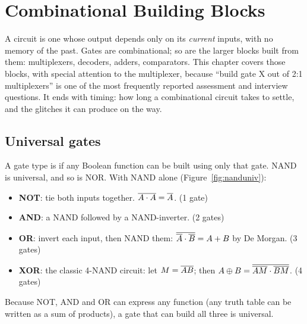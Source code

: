 \chapter{Combinational Building Blocks}
\label{ch:comb}

A  circuit is one whose output depends only on its \emph{current} inputs, with no memory of the past. Gates are combinational; so are the larger blocks built from them: multiplexers, decoders, adders, comparators. This chapter covers those blocks, with special attention to the multiplexer, because ``build gate X out of 2:1 multiplexers'' is one of the most frequently reported assessment and interview questions. It ends with timing: how long a combinational circuit takes to settle, and the glitches it can produce on the way.

\section{Universal gates}

A gate type is  if any Boolean function can be built using only that gate. NAND is universal, and so is NOR. With NAND alone (Figure~\ref{fig:nanduniv}):

\begin{itemize}
  \item \textbf{NOT}: tie both inputs together. $\overline{A \cdot A} = \overline{A}$. (1 gate)
  \item \textbf{AND}: a NAND followed by a NAND-inverter. (2 gates)
  \item \textbf{OR}: invert each input, then NAND them: $\overline{\overline{A}\cdot\overline{B}} = A + B$ by De Morgan. (3 gates)
  \item \textbf{XOR}: the classic 4-NAND circuit: let $M = \overline{AB}$; then $A \oplus B = \overline{\overline{A M} \cdot \overline{B M}}$. (4 gates)
\end{itemize}

Because NOT, AND and OR can express any function (any truth table can be written as a sum of products), a gate that can build all three is universal.

